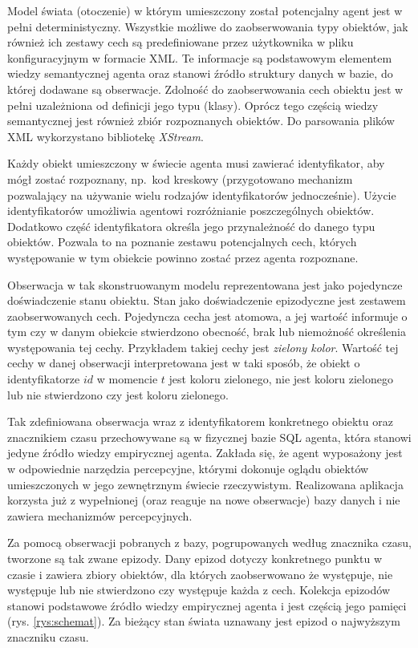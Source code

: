 Model świata (otoczenie) w którym umieszczony został potencjalny agent jest w pełni deterministyczny. Wszystkie możliwe do zaobserwowania typy obiektów, jak również ich zestawy cech są predefiniowane przez użytkownika w pliku konfiguracyjnym w formacie XML. Te informacje są podstawowym elementem wiedzy semantycznej agenta oraz stanowi źródło struktury danych w bazie, do której dodawane są obserwacje. Zdolność do zaobserwowania cech obiektu jest w pełni uzależniona od definicji jego typu (klasy). Oprócz tego częścią wiedzy semantycznej jest również zbiór rozpoznanych obiektów. Do parsowania plików XML wykorzystano bibliotekę \textit{XStream}.

Każdy obiekt umieszczony w świecie agenta musi zawierać identyfikator, aby mógł zostać rozpoznany, np.\ kod kreskowy (przygotowano mechanizm pozwalający na używanie wielu rodzajów identyfikatorów jednocześnie). Użycie identyfikatorów umożliwia agentowi rozróżnianie poszczególnych obiektów. Dodatkowo część identyfikatora określa jego przynależność do danego typu obiektów. Pozwala to na poznanie zestawu potencjalnych cech, których występowanie w tym obiekcie powinno zostać przez agenta rozpoznane. 

Obserwacja w tak skonstruowanym modelu reprezentowana jest jako pojedyncze doświadczenie stanu obiektu. Stan jako doświadczenie epizodyczne jest zestawem zaobserwowanych cech. Pojedyncza cecha jest atomowa, a jej wartość informuje o tym czy w danym obiekcie stwierdzono obecność, brak lub niemożność określenia występowania tej cechy. Przykładem takiej cechy jest \textit{zielony kolor}. Wartość tej cechy w danej obserwacji interpretowana jest w taki sposób, że  obiekt o identyfikatorze $ id $ w momencie $ t $ jest koloru zielonego, nie jest koloru zielonego lub nie stwierdzono czy jest koloru zielonego.

Tak zdefiniowana obserwacja wraz z identyfikatorem konkretnego obiektu oraz znacznikiem czasu przechowywane są w fizycznej bazie SQL agenta, która stanowi jedyne źródło wiedzy empirycznej agenta. Zakłada się, że agent wyposażony jest w odpowiednie narzędzia percepcyjne, którymi dokonuje oglądu obiektów umieszczonych w jego zewnętrznym świecie rzeczywistym. Realizowana aplikacja korzysta już z wypełnionej (oraz reaguje na nowe obserwacje) bazy danych i nie zawiera mechanizmów percepcyjnych.

Za pomocą obserwacji pobranych z bazy, pogrupowanych według znacznika czasu, tworzone są tak zwane epizody. Dany epizod dotyczy konkretnego punktu w czasie i zawiera zbiory obiektów, dla których zaobserwowano że występuje, nie występuje lub nie stwierdzono czy występuje każda z cech. Kolekcja epizodów stanowi podstawowe źródło wiedzy empirycznej agenta i jest częścią jego pamięci (rys. \ref{rys:schemat}). Za bieżący stan świata uznawany jest epizod o najwyższym znaczniku czasu.

